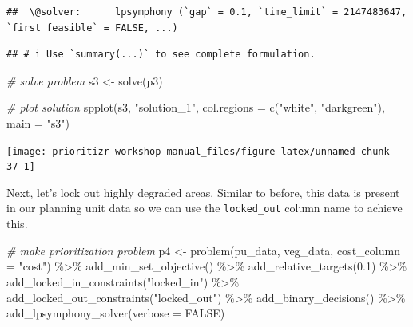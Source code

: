 \documentclass[
  12pt,
]{book}
\newenvironment{Shaded}{\begin{snugshade}}{\end{snugshade}}
\newcommand{\AttributeTok}[1]{\textcolor[rgb]{0.77,0.63,0.00}{#1}}
\newcommand{\CommentTok}[1]{\textcolor[rgb]{0.56,0.35,0.01}{\textit{#1}}}
\newcommand{\ConstantTok}[1]{\textcolor[rgb]{0.00,0.00,0.00}{#1}}
\newcommand{\FloatTok}[1]{\textcolor[rgb]{0.00,0.00,0.81}{#1}}
\newcommand{\FunctionTok}[1]{\textcolor[rgb]{0.00,0.00,0.00}{#1}}
\newcommand{\NormalTok}[1]{#1}
\newcommand{\OtherTok}[1]{\textcolor[rgb]{0.56,0.35,0.01}{#1}}
\newcommand{\SpecialCharTok}[1]{\textcolor[rgb]{0.00,0.00,0.00}{#1}}
\newcommand{\StringTok}[1]{\textcolor[rgb]{0.31,0.60,0.02}{#1}}
\begin{document}
\begin{verbatim}
##  \@solver:      lpsymphony (`gap` = 0.1, `time_limit` = 2147483647, `first_feasible` = FALSE, ...)
\end{verbatim}

\begin{verbatim}
## # i Use `summary(...)` to see complete formulation.
\end{verbatim}

\begin{Shaded}
\begin{Highlighting}[]
\CommentTok{\# solve problem}
\NormalTok{s3 }\OtherTok{\textless{}{-}} \FunctionTok{solve}\NormalTok{(p3)}

\CommentTok{\# plot solution}
\FunctionTok{spplot}\NormalTok{(s3, }\StringTok{"solution\_1"}\NormalTok{, }\AttributeTok{col.regions =} \FunctionTok{c}\NormalTok{(}\StringTok{"white"}\NormalTok{, }\StringTok{"darkgreen"}\NormalTok{), }\AttributeTok{main =} \StringTok{"s3"}\NormalTok{)}
\end{Highlighting}
\end{Shaded}

\begin{center}\texttt{[image: prioritizr-workshop-manual\_files/figure-latex/unnamed-chunk-37-1]} \end{center}

Next, let's lock out highly degraded areas. Similar to before, this data is present in our planning unit data so we can use the \texttt{locked\_out} column name to achieve this.

\begin{Shaded}
\begin{Highlighting}[]
\CommentTok{\# make prioritization problem}
\NormalTok{p4 }\OtherTok{\textless{}{-}} \FunctionTok{problem}\NormalTok{(pu\_data, veg\_data, }\AttributeTok{cost\_column =} \StringTok{"cost"}\NormalTok{) }\SpecialCharTok{\%\textgreater{}\%}
      \FunctionTok{add\_min\_set\_objective}\NormalTok{() }\SpecialCharTok{\%\textgreater{}\%}
      \FunctionTok{add\_relative\_targets}\NormalTok{(}\FloatTok{0.1}\NormalTok{) }\SpecialCharTok{\%\textgreater{}\%}
      \FunctionTok{add\_locked\_in\_constraints}\NormalTok{(}\StringTok{"locked\_in"}\NormalTok{) }\SpecialCharTok{\%\textgreater{}\%}
      \FunctionTok{add\_locked\_out\_constraints}\NormalTok{(}\StringTok{"locked\_out"}\NormalTok{) }\SpecialCharTok{\%\textgreater{}\%}
      \FunctionTok{add\_binary\_decisions}\NormalTok{() }\SpecialCharTok{\%\textgreater{}\%}
      \FunctionTok{add\_lpsymphony\_solver}\NormalTok{(}\AttributeTok{verbose =} \ConstantTok{FALSE}\NormalTok{)}
\end{Highlighting}
\end{Shaded}
\end{document}
